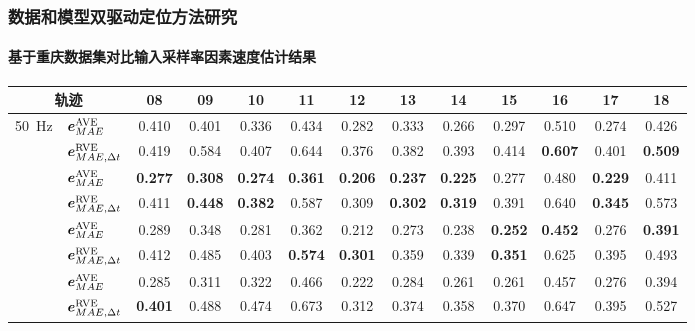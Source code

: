 \begin{frame} 
 	\frametitle{数据和模型双驱动定位方法研究}
 	\framesubtitle{基于重庆数据集对比输入采样率因素速度估计结果}
    {\footnotesize
    \setlength{\tabcolsep}{2pt}
		\begin{tabular*}{\linewidth}{@{\extracolsep{\fill}}clccccccccccc}
			\toprule
			\multicolumn{2}{c}{轨迹} & 08 & 09 & 10 & 11 & 12 & 13 & 14 & 15 & 16 & 17 & 18 \\
			\midrule
			\multirow{2}{*}{\SI{50}{Hz}} 
			& $\vb*{e}^{\mathrm{AVE}}_{MAE}$ 
			& 0.410 & 0.401 & 0.336 & 0.434 & 0.282 & 0.333 & 0.266 & 0.297 & 0.510 & 0.274 & 0.426 \\
			& $\vb*{e}^{\mathrm{RVE}}_{MAE, \Delta t}$ 
			& 0.419 & 0.584 & 0.407 & 0.644 & 0.376 & 0.382 & 0.393 & 0.414 & \textbf{0.607} & 0.401 & \textbf{0.509} \\ \addlinespace[1mm]
			\multirow{2}{*}{\SI{100}{Hz}} 
			& $\vb*{e}^{\mathrm{AVE}}_{MAE}$ 
			& \textbf{0.277} & \textbf{0.308} & \textbf{0.274} & \textbf{0.361} & \textbf{0.206} & \textbf{0.237} & \textbf{0.225} & 0.277 & 0.480 & \textbf{0.229} & 0.411 \\ 
			& $\vb*{e}^{\mathrm{RVE}}_{MAE, \Delta t}$ 
			& 0.411 & \textbf{0.448} & \textbf{0.382} & 0.587 & 0.309 & \textbf{0.302} & \textbf{0.319} & 0.391 & 0.640 & \textbf{0.345} & 0.573 \\ \addlinespace[1mm]
			\multirow{2}{*}{\SI{150}{Hz}} 
			& $\vb*{e}^{\mathrm{AVE}}_{MAE}$ 
			& 0.289 & 0.348 & 0.281 & 0.362 & 0.212 & 0.273 & 0.238 & \textbf{0.252} & \textbf{0.452} & 0.276 & \textbf{0.391} \\
			& $\vb*{e}^{\mathrm{RVE}}_{MAE, \Delta t}$ 
			& 0.412 & 0.485 & 0.403 & \textbf{0.574} & \textbf{0.301} & 0.359 & 0.339 & \textbf{0.351} & 0.625 & 0.395 & 0.493 \\ \addlinespace[1mm]
			\multirow{2}{*}{\SI{200}{Hz}} 
			& $\vb*{e}^{\mathrm{AVE}}_{MAE}$ 
			& 0.285 & 0.311 & 0.322 & 0.466 & 0.222 & 0.284 & 0.261 & 0.261 & 0.457 & 0.276 & 0.394 \\         
			& $\vb*{e}^{\mathrm{RVE}}_{MAE, \Delta t}$ 
			& \textbf{0.401} & 0.488 & 0.474 & 0.673 & 0.312 & 0.374 & 0.358 & 0.370 & 0.647 & 0.395 & 0.527 \\
			\bottomrule 
		\end{tabular*}
	}	
\end{frame}

